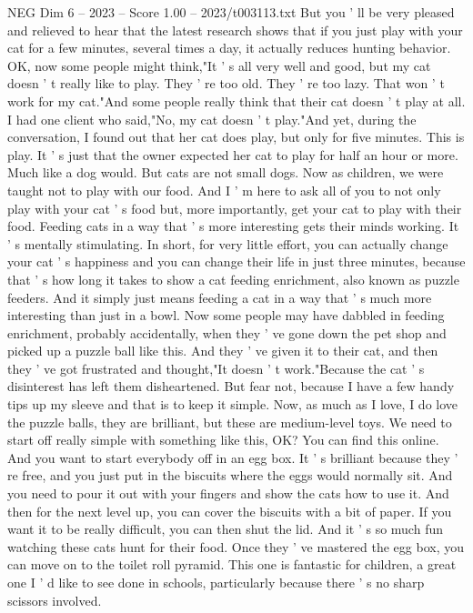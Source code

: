 \begin{textsample}{NEG Dim 6 – 2023 – Score 1.00 – 2023/t003113.txt}
But you ' ll be very pleased and relieved to hear that the latest research shows that if you just play with your cat for a few minutes, several times a day, it actually reduces hunting behavior.
OK, now some people might think,"It ' s all very well and good, but my cat doesn ' t really like to play.
They ' re too old.
They ' re too lazy.
That won ' t work for my cat."And some people really think that their cat doesn ' t play at all.
I had one client who said,"No, my cat doesn ' t play."And yet, during the conversation, I found out that her cat does play, but only for five minutes.
This is play.
It ' s just that the owner expected her cat to play for half an hour or more.
Much like a dog would.
But cats are not small dogs.
Now as children, we were taught not to play with our food.
And I ' m here to ask all of you to not only play with your cat ' s food but, more importantly, get your cat to play with their food.
Feeding cats in a way that ' s more interesting gets their minds working.
It ' s mentally stimulating.
In short, for very little effort, you can actually change your cat ' s happiness and you can change their life in just three minutes, because that ' s how long it takes to show a cat feeding enrichment, also known as puzzle feeders.
And it simply just means feeding a cat in a way that ' s much more interesting than just in a bowl.
Now some people may have dabbled in feeding enrichment, probably accidentally, when they ' ve gone down the pet shop and picked up a puzzle ball like this.
And they ' ve given it to their cat, and then they ' ve got frustrated and thought,"It doesn ' t work."Because the cat ' s disinterest has left them disheartened.
But fear not, because I have a few handy tips up my sleeve and that is to keep it simple.
Now, as much as I love, I do love the puzzle balls, they are brilliant, but these are medium-level toys.
We need to start off really simple with something like this, OK?
You can find this online.
And you want to start everybody off in an egg box.
It ' s brilliant because they ' re free, and you just put in the biscuits where the eggs would normally sit.
And you need to pour it out with your fingers and show the cats how to use it.
And then for the next level up, you can cover the biscuits with a bit of paper.
If you want it to be really difficult, you can then shut the lid.
And it ' s so much fun watching these cats hunt for their food.
Once they ' ve mastered the egg box, you can move on to the toilet roll pyramid.
This one is fantastic for children, a great one I ' d like to see done in schools, particularly because there ' s no sharp scissors involved.

\end{textsample}
